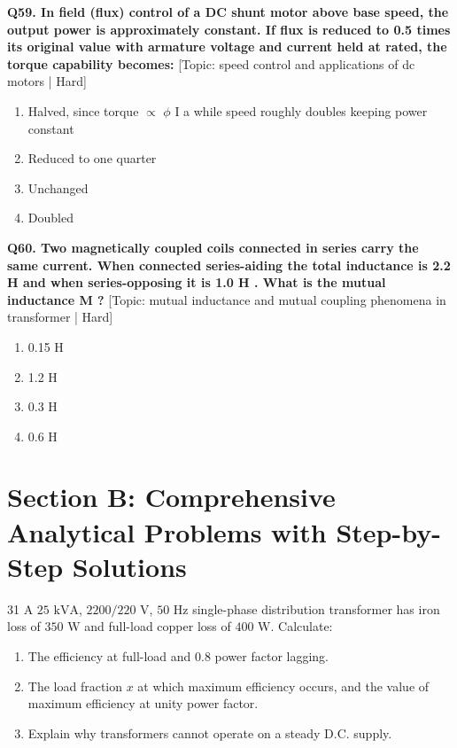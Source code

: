 \noindent\textbf{Q59. In field (flux) control of a DC shunt motor above base speed, the output power is approximately constant. If flux is reduced to 0.5 times its original value with armature voltage and current held at rated, the torque capability becomes:} \hfill [Topic: speed control and applications of dc motors | Hard]
\begin{enumerate}[label=(\alph*),topsep=2pt,itemsep=1pt,partopsep=0pt,parsep=0pt]
    \item {Halved, since torque $\propto$ $\phi$ I a while speed roughly doubles keeping power constant}
    \item {Reduced to one quarter}
    \item {Unchanged}
    \item {Doubled}
\end{enumerate}
\vspace{2mm}

\noindent\textbf{Q60. Two magnetically coupled coils connected in series carry the same current. When connected series-aiding the total inductance is 2.2 H and when series-opposing it is 1.0 H . What is the mutual inductance M ?} \hfill [Topic: mutual inductance and mutual coupling phenomena in transformer | Hard]
\begin{enumerate}[label=(\alph*),topsep=2pt,itemsep=1pt,partopsep=0pt,parsep=0pt]
    \item {0.15 H}
    \item {1.2 H}
    \item {0.3 H}
    \item {0.6 H}
\end{enumerate}
\vspace{2mm}


\newpage
\section{Section B: Comprehensive Analytical Problems with Step-by-Step Solutions}

\begin{subjectiveq}{3}{1}
A $25\text{ kVA}$, $2200/220\text{ V}$, $50\text{ Hz}$ single-phase distribution transformer has iron loss of $350\text{ W}$ and full-load copper loss of $400\text{ W}$. Calculate:\begin{enumerate}[label=(\alph*)]\item The efficiency at full-load and $0.8$ power factor lagging.\item The load fraction $x$ at which maximum efficiency occurs, and the value of maximum efficiency at unity power factor.\item Explain why transformers cannot operate on a steady D.C. supply.\end{enumerate}
\end{subjectiveq}

